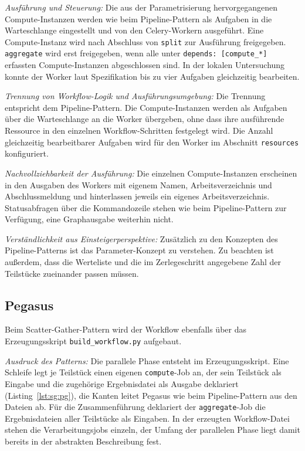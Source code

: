 \emph{Ausführung und Steuerung:} Die aus der Parametrisierung
hervorgegangenen Compute-Instanzen werden wie beim Pipeline-Pattern
als Aufgaben in die Warteschlange eingestellt und von den
Celery-Workern ausgeführt. Eine Compute-Instanz wird nach Abschluss
von \texttt{split} zur Ausführung freigegeben. \texttt{aggregate}
wird erst freigegeben, wenn alle unter
\texttt{depends: [compute\_*]} erfassten Compute-Instanzen
abgeschlossen sind. In der lokalen Untersuchung konnte der Worker
laut Spezifikation bis zu vier Aufgaben gleichzeitig bearbeiten.

\emph{Trennung von Workflow-Logik und Ausführungsumgebung:} Die
Trennung entspricht dem Pipeline-Pattern. Die Compute-Instanzen
werden als Aufgaben über die Warteschlange an die Worker übergeben,
ohne dass ihre ausführende Ressource in den einzelnen
Workflow-Schritten festgelegt wird. Die Anzahl gleichzeitig
bearbeitbarer Aufgaben wird für den Worker im Abschnitt
\texttt{resources} konfiguriert.

\emph{Nachvollziehbarkeit der Ausführung:} Die einzelnen
Compute-Instanzen erscheinen in den Ausgaben des Workers mit eigenem
Namen, Arbeitsverzeichnis und Abschlussmeldung und hinterlassen
jeweils ein eigenes Arbeitsverzeichnis. Statusabfragen über die
Kommandozeile stehen wie beim Pipeline-Pattern zur Verfügung, eine
Graphausgabe weiterhin nicht.

\emph{Verständlichkeit aus Einsteigerperspektive:} Zusätzlich zu den
Konzepten des Pipeline-Patterns ist das Parameter-Konzept zu
verstehen. Zu beachten ist außerdem, dass die Werteliste und die im Zerlegeschritt angegebene Zahl der Teilstücke zueinander passen müssen.

\subsection{Pegasus}
\label{sec:lokal:sg:pegasus}

Beim Scatter-Gather-Pattern wird der Workflow ebenfalls über das
Erzeugungsskript \texttt{build\_workflow.py} aufgebaut.

\emph{Ausdruck des Patterns:} Die parallele Phase entsteht im
Erzeugungsskript. Eine Schleife legt je Teilstück einen eigenen
\texttt{compute}-Job an, der sein Teilstück als Eingabe und die
zugehörige Ergebnisdatei als Ausgabe deklariert (Listing~\ref{lst:sg:pg}), die Kanten leitet
Pegasus wie beim Pipeline-Pattern aus den Dateien ab. Für die
Zusammenführung deklariert der \texttt{aggregate}-Job die
Ergebnisdateien aller Teilstücke als Eingaben. In der erzeugten
Workflow-Datei stehen die Verarbeitungsjobs einzeln, der Umfang der
parallelen Phase liegt damit bereits in der abstrakten Beschreibung
fest.

